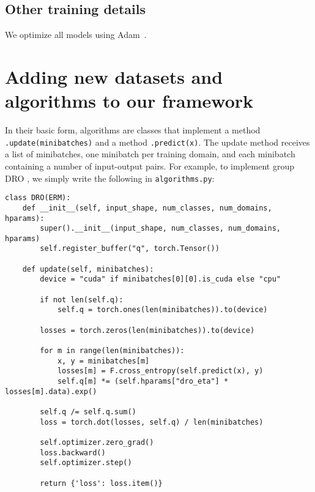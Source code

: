 \documentclass{article}
\begin{document}
\subsection{Other training details}

We optimize all models using Adam~\citep{kingma2014adam}.

\clearpage
\newpage
\section{Adding new datasets and algorithms to our framework}
\label{sec:code_example}

In their basic form, algorithms are classes that implement a method \texttt{.update(minibatches)} and a method \texttt{.predict(x)}.
The update method receives a list of minibatches, one minibatch per training domain, and each minibatch containing a number of input-output pairs. 
For example, to implement group DRO \citep[Algorithm 1]{sagawa2019distributionally}, we simply write the following in \texttt{algorithms.py}:


\newsavebox{\lsta}
\begin{lrbox}{\lsta}
\begin{lstlisting}
class DRO(ERM):
    def __init__(self, input_shape, num_classes, num_domains, hparams):
        super().__init__(input_shape, num_classes, num_domains, hparams)
        self.register_buffer("q", torch.Tensor())

    def update(self, minibatches):
        device = "cuda" if minibatches[0][0].is_cuda else "cpu"

        if not len(self.q):
            self.q = torch.ones(len(minibatches)).to(device)

        losses = torch.zeros(len(minibatches)).to(device)

        for m in range(len(minibatches)):
            x, y = minibatches[m]
            losses[m] = F.cross_entropy(self.predict(x), y)
            self.q[m] *= (self.hparams["dro_eta"] * losses[m].data).exp()

        self.q /= self.q.sum()
        loss = torch.dot(losses, self.q) / len(minibatches)

        self.optimizer.zero_grad()
        loss.backward()
        self.optimizer.step()

        return {'loss': loss.item()}
\end{lstlisting}
\end{lrbox}
\end{document}
